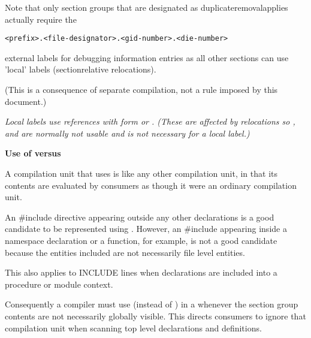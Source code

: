 Note that only 
section groups that are designated as
duplicate\dash removal\dash applies actually require the
\begin{alltt}
    <prefix>.<file-designator>.<gid-number>.<die-number>
\end{alltt}
external labels for debugging information entries as all other
 sections can use 'local' labels 
(section\dash relative
relocations).

(This is a consequence of separate compilation, not a rule
imposed by this document.)

\textit{Local labels use references with form 
or 
. 
(These are affected by relocations
so 
, 
 and 
 are
normally not usable and 
 is not necessary
for a local label.)}

\textbf{Use of  versus 
}

A  compilation unit that uses 
is like any other compilation unit, in that its contents
are evaluated by consumers as though it were an ordinary
compilation unit.

An \#include directive appearing outside any other
declarations is a good candidate to be represented using
. 
However, an \#include appearing inside
a  namespace declaration or a function, for example, is
not a good candidate because the entities included are not
necessarily file level entities.

This also applies to  INCLUDE lines when declarations
are included into a procedure or module context.

Consequently a compiler must use  (instead
of ) 
in a  
whenever the section group 
contents are not necessarily globally visible. 
This
directs consumers to ignore that compilation unit when scanning
top level declarations and definitions.

